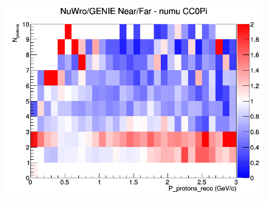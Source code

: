 \documentclass[12pt]{article}
\begin{document}
\begin{figure}[h]
\endminipage
{}
\includegraphics[width=\linewidth]{eff_N_P/FGT/protons/ratios/CC0Pi_NuWro_GENIE_numu_NF_N_P.png}
\endminipage
\newline
\end{figure}
\clearpage
\end{document}
